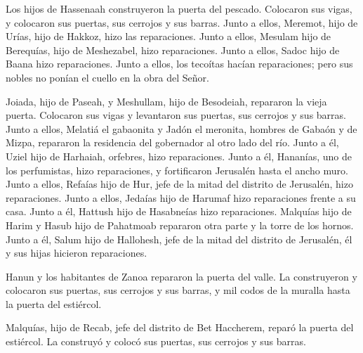  Los hijos de Hassenaah construyeron la puerta del
pescado. Colocaron sus vigas, y colocaron sus puertas, sus cerrojos y
sus barras.  Junto a ellos, Meremot, hijo de Urías, hijo
de Hakkoz, hizo las reparaciones. Junto a ellos, Mesulam hijo de
Berequías, hijo de Meshezabel, hizo reparaciones. Junto a ellos, Sadoc
hijo de Baana hizo reparaciones.  Junto a ellos, los
tecoítas hacían reparaciones; pero sus nobles no ponían el cuello en la
obra del Señor.

 Joiada, hijo de Paseah, y Meshullam, hijo de Besodeiah,
repararon la vieja puerta. Colocaron sus vigas y levantaron sus puertas,
sus cerrojos y sus barras.  Junto a ellos, Melatiá el
gabaonita y Jadón el meronita, hombres de Gabaón y de Mizpa, repararon
la residencia del gobernador al otro lado del río.  Junto
a él, Uziel hijo de Harhaiah, orfebres, hizo reparaciones. Junto a él,
Hananías, uno de los perfumistas, hizo reparaciones, y fortificaron
Jerusalén hasta el ancho muro.  Junto a ellos, Refaías
hijo de Hur, jefe de la mitad del distrito de Jerusalén, hizo
reparaciones.  Junto a ellos, Jedaías hijo de Harumaf
hizo reparaciones frente a su casa. Junto a él, Hattush hijo de
Hasabneías hizo reparaciones.  Malquías hijo de Harim y
Hasub hijo de Pahatmoab repararon otra parte y la torre de los hornos.
 Junto a él, Salum hijo de Hallohesh, jefe de la mitad
del distrito de Jerusalén, él y sus hijas hicieron reparaciones.

 Hanun y los habitantes de Zanoa repararon la puerta del
valle. La construyeron y colocaron sus puertas, sus cerrojos y sus
barras, y mil codos de la muralla hasta la puerta del estiércol.

 Malquías, hijo de Recab, jefe del distrito de Bet
Haccherem, reparó la puerta del estiércol. La construyó y colocó sus
puertas, sus cerrojos y sus barras.


